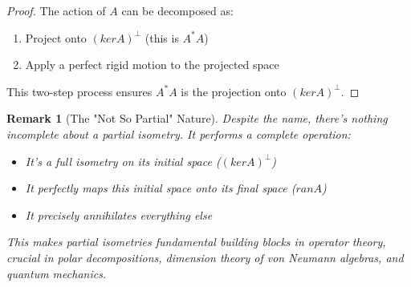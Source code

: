 \documentclass{article}
\newtheorem{remark}[theorem]{Remark}
\begin{document}
\begin{proof}
The action of $A$ can be decomposed as:
\begin{enumerate}
    \item Project onto $(ker A)^\perp$ (this is $A^*A$)
    \item Apply a perfect rigid motion to the projected space
\end{enumerate}
This two-step process ensures $A^*A$ is the projection onto $(ker A)^\perp$.
\end{proof}

\begin{remark}[The "Not So Partial" Nature]
Despite the name, there's nothing incomplete about a partial isometry. It performs a complete operation:
\begin{itemize}
    \item It's a full isometry on its initial space ($(ker A)^\perp$)
    \item It perfectly maps this initial space onto its final space ($ran A$)
    \item It precisely annihilates everything else
\end{itemize}
This makes partial isometries fundamental building blocks in operator theory, crucial in polar decompositions, dimension theory of von Neumann algebras, and quantum mechanics.
\end{remark}
\end{document}
